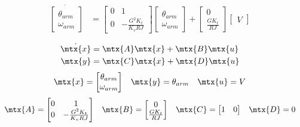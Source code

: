 \begin{align*}
  \dot{\begin{bmatrix}
    \theta_{arm} \\
    \omega_{arm}
  \end{bmatrix}} &=
  \begin{bmatrix}
    0 & 1 \\
    0 & -\frac{G^2 K_t}{K_v RJ}
  \end{bmatrix}
  \begin{bmatrix}
    \theta_{arm} \\
    \omega_{arm}
  \end{bmatrix} +
  \begin{bmatrix}
    0 \\
    \frac{GK_t}{RJ}
  \end{bmatrix}
  \begin{bmatrix}
    V
  \end{bmatrix}
\end{align*}

\begin{theorem}
  \begin{align*}
    \dot{\mtx{x}} &= \mtx{A} \mtx{x} + \mtx{B} \mtx{u} \\
    \mtx{y} &= \mtx{C} \mtx{x} + \mtx{D} \mtx{u}
  \end{align*}
  \begin{equation*}
    \begin{array}{ccc}
      \mtx{x} =
      \begin{bmatrix}
        \theta_{arm} \\
        \omega_{arm}
      \end{bmatrix} &
      \mtx{y} = \theta_{arm} &
      \mtx{u} = V
    \end{array}
  \end{equation*}
  \begin{equation}
    \begin{array}{cccc}
      \mtx{A} =
      \begin{bmatrix}
        0 & 1 \\
        0 & -\frac{G^2 K_t}{K_v RJ}
      \end{bmatrix} &
      \mtx{B} =
      \begin{bmatrix}
        0 \\
        \frac{G K_t}{RJ}
      \end{bmatrix} &
      \mtx{C} =
      \begin{bmatrix}
        1 & 0
      \end{bmatrix} &
      \mtx{D} = 0
    \end{array}
  \end{equation}
\end{theorem}

